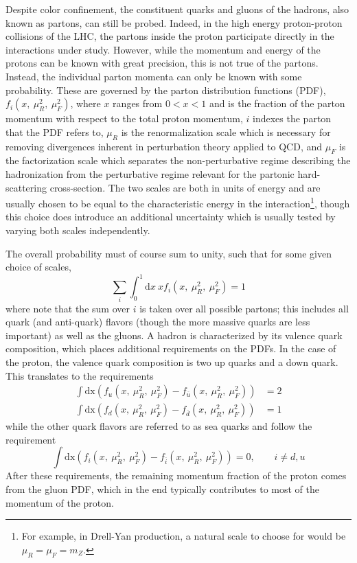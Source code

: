 Despite color confinement, 
the constituent quarks and gluons of the hadrons, also known as partons, can still 
be probed. Indeed, in the high energy proton-proton collisions of the LHC, 
the partons inside the proton participate
directly in the interactions under study.  However,
while the momentum and energy of the protons can be known with
great precision, 
this is not true of the partons. Instead, the individual
parton momenta can only be known with some probability.
These are governed by the parton distribution functions (PDF),
$f_i(x,~\mu_R^2,~\mu_F^2)$, where $x$ ranges from $0<x<1$ and is the fraction of 
the parton momentum 
with respect to the total proton momentum, $i$ indexes the parton
that the PDF refers to, 
$\mu_R$ is the renormalization scale which is necessary for
removing divergences inherent in perturbation theory applied to QCD, and 
$\mu_F$ is the factorization scale which separates the non-perturbative
regime describing the hadronization from the perturbative regime
relevant for the partonic hard-scattering cross-section.
The two scales are both in units of energy 
and are usually chosen to be equal to the characteristic
energy in the interaction\footnote{For example, in Drell-Yan production, 
a natural scale to choose for would be $\mu_R = \mu_F = m_Z$.},
though this choice does introduce an additional uncertainty which
is usually tested by varying both scales independently.

The overall probability must of course sum to unity, such that
for some given choice of scales, 
\begin{equation}
\sum_i \int_0^1 \mathrm{d}x~x f_i(x,~\mu_R^2,~\mu_F^2) = 1
\end{equation}
where note that the sum over $i$ is taken over all possible partons;
this includes all quark (and anti-quark) flavors (though the more massive quarks 
are less important) as well as the gluons.
A hadron is characterized by its valence quark 
composition, which places additional requirements on the PDFs. 
In the case of the proton, the valence quark composition is 
two up quarks and a down quark.
This translates to the requirements 
\begin{align}
\int \mathrm{dx} (f_u(x,~\mu_R^2,~\mu_F^2) - f_{\overline{u}}(x,~\mu_R^2,~\mu_F^2) ) &= 2 \\
\int \mathrm{dx} (f_d(x,~\mu_R^2,~\mu_F^2) - f_{\overline{d}}(x,~\mu_R^2,~\mu_F^2) ) &= 1 
\end{align}
while the other quark flavors are referred to as sea quarks 
and follow the requirement
\begin{equation}
\int \mathrm{dx} (f_i(x,~\mu_R^2,~\mu_F^2) - f_{\overline{i}}(x,~\mu_R^2,~\mu_F^2) ) = 0, ~~~~~~~~~ i\neq d,u
\end{equation}
After these requirements, the remaining momentum fraction of the proton
comes from the gluon PDF, which in the end typically contributes to most
of the momentum of the proton.

